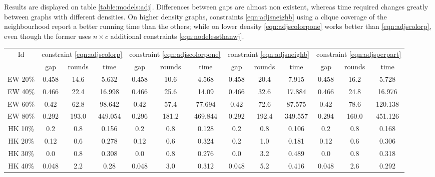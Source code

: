 Results are displayed on table \ref{table:models:adj}. Differences between gaps are almost non existent, whereas time required changes greatly between graphs with different densities. On higher density graphs, constraints \ref{eqn:adjsneighb} using a clique coverage of the neighbourhood report a better running time than the others; while on lower density \ref{eqn:adjscolorpone} works better than \ref{eqn:adjscolorp}, even though the former uses $n \times c$ additional constraints \ref{eqn:nodelessthanwj}.

\begin{sidewaystable}
\label{table:models:adj}
\centering

	\begin{tabular}{|c|ccc|ccc|ccc|ccc|}
	\hline
	\multicolumn{1}{|c|}{Id} & \multicolumn{3}{|c|}{constraint \ref{eqn:adjscolorp}} & \multicolumn{3}{|c|}{constraint \ref{eqn:adjscolorpone}} & \multicolumn{3}{|c|}{constraint \ref{eqn:adjsneighb}} & \multicolumn{3}{|c|}{constraint \ref{eqn:adjsperpart}} 
	\\
	& gap & rounds & time & gap & rounds & time & gap & rounds & time & gap & rounds & time 
	\\
	\hline
	EW 20\% & 0.458 & 14.6 & 5.632 & 0.458 & 10.6 & 4.568 & 0.458 & 20.4 & 7.915 & 0.458 & 16.2 & 5.728
	\\
	EW 40\% & 0.466 & 22.4 & 16.998 & 0.466 & 25.6 & 14.09 & 0.466 & 32.6 & 17.884 & 0.466 & 24.8 & 16.976
	\\
	EW 60\% & 0.42 & 62.8 & 98.642 & 0.42 & 57.4 & 77.694 & 0.42 & 72.6 & 87.575 & 0.42 & 78.6 & 120.138
	\\
	EW 80\% & 0.292 & 193.0 & 449.054 & 0.296 & 181.2 & 469.844 & 0.292 & 192.4 & 349.557 & 0.294 & 160.0 & 451.126
	\\
	\hline
	HK 10\% &  0.2 &  0.8 & 0.156 &  0.2 &  0.8 & 0.128 &  0.2 &  0.8 & 0.106 &  0.2 &  0.8 & 0.168
	\\
	HK 20\% & 0.12 &  0.6 & 0.278 & 0.12 &  0.6 & 0.324 &  0.2 &  1.0 & 0.181 & 0.12 &  0.6 & 0.306
	\\
	HK 30\% &  0.0 &  0.8 & 0.308 &  0.0 &  0.8 & 0.276 &  0.0 &  3.2 & 0.489 &  0.0 &  0.8 & 0.318
	\\
	HK 40\% & 0.048 &  2.2 & 0.28 & 0.048 &  3.0 & 0.312 & 0.048 &  5.2 & 0.416 & 0.048 &  2.6 & 0.292
	\\
	\hline 
	 \end{tabular}
	
	\caption{Comparison of different color conflict constraints on the model formulation: adjacent nodes sum bounded by $w_j$ (\ref{eqn:adjscolorp}), adjacent nodes sum bounded by $1$ (\ref{eqn:adjscolorpone}), adjacencies grouped by partition (\ref{eqn:adjsperpart}) and using clique coverage of the neighbourhood (\ref{eqn:adjsneighb}).}
\end{sidewaystable}

